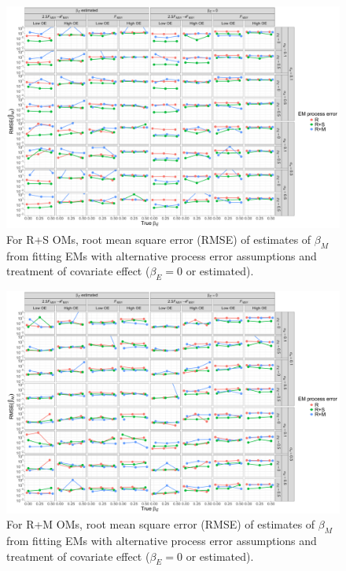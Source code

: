 \documentclass[
  12pt,
]{article}
\begin{document}
\begin{landscape}
\begin{figure}
\begin{center}
\includegraphics[height = \textheight]{beta_M_rmse_RSom}
\end{center}
\caption{For R+S OMs, root mean square error (RMSE) of estimates of  $\beta_M$ from fitting EMs with alternative process error assumptions and treatment of covariate effect ($\beta_E = 0$ or estimated).}\label{beta_M_rmse_RSom}
\end{figure}
\end{landscape}

\begin{landscape}
\begin{figure}
\begin{center}
\includegraphics[height = \textheight]{beta_M_rmse_RMom}
\end{center}
\caption{For R+M OMs, root mean square error (RMSE) of estimates of  $\beta_M$ from fitting EMs with alternative process error assumptions and treatment of covariate effect ($\beta_E = 0$ or estimated).}\label{beta_M_rmse_RMom}
\end{figure}
\end{landscape}
\end{document}
